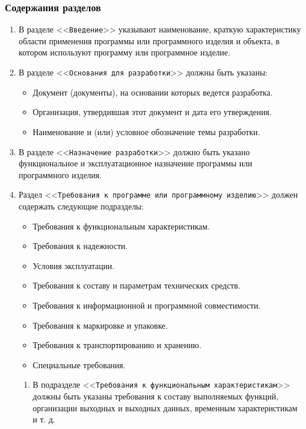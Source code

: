 \documentclass[a4paper, 14pt]{article}
\begin{document}
\subsubsection{Содержания разделов}

\begin{enumerate}
    \item В разделе <<\texttt{Введение}>> указывают наименование, краткую характеристику области применения программы или программного изделия и объекта, в котором используют программу или программное изделие.
    \item В разделе <<\texttt{Основания для разработки}>> должны быть указаны:
    \begin{itemize}
        \item Документ (документы), на основании которых ведется разработка.
        \item Организация, утвердившая этот документ и дата его утверждения.
        \item Наименование и (или) условное обозначение темы разработки.
    \end{itemize}
    \item В разделе <<\texttt{Назначение разработки}>> должно быть указано функциональное и эксплуатационное назначение программы или программного изделия.
    \item Раздел <<\texttt{Требования к программе или программному изделию}>> должен содержать следующие подразделы:
    \begin{itemize}
        \item Требования к функциональным характеристикам.
        \item Требования к надежности.
        \item Условия эксплуатации.
        \item Требования к составу и параметрам технических средств.
        \item Требования к информационной и программной совместимости.
        \item Требования к маркировке и упаковке.
        \item Требования к транспортированию и хранению.
        \item Специальные требования.
    \end{itemize}
    \begin{enumerate}
        \item В подразделе <<\texttt{Требования к функциональным характеристикам}>> должны быть указаны требования к составу выполняемых функций, организации выходных и выходных данных, временным характеристикам и т. д.

\end{enumerate}
\end{enumerate}
\end{document}
